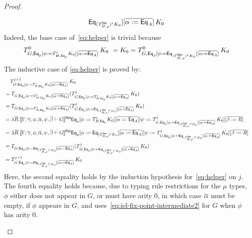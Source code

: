 \documentclass[acmsmall,review,anonymous]{acmart}
\theoremstyle{definition}
\begin{document}
\begin{proof}
\begin{itemize}
\begin{itemize}
\begin{equation}
{    \mathsf{Eq}_{(T^{{\mathsf{Set}}}_{H,\rho})^i K_0}][\overline{\alpha :=
      \mathsf{Eq}_A}]}\,K_0
\end{equation}
Indeed, the base case of~\eqref{eq:helper} is trivial because
\[T^0_{G,
  \mathsf{Eq}_{\rho}[\phi := T^{i}_{H,\mathsf{Eq}_{\rho}} K_0][\overline{\alpha :=
      \mathsf{Eq}_A}]}\,K_0 \ = K_0 = T^0_{G, \mathsf{Eq}_{\rho}[\phi :=
    \mathsf{Eq}_{(T^{{\mathsf{Set}}}_{H,\rho})^i K_0}][\overline{\alpha :=
      \mathsf{Eq}_A}]}\,K_0\] The inductive case of \eqref{eq:helper}
is proved by: \\
\begin{align*}
&\;\;\;\; T^{j+1}_{G, \mathsf{Eq}_{\rho}[\phi := T^{i}_{H,\mathsf{Eq}_{\rho}} K_0][\overline{\alpha := \mathsf{Eq}_A}]}\,K_0 \\
&= T_{G, \mathsf{Eq}_{\rho}[\phi := T^{i}_{H,\mathsf{Eq}_{\rho}} K_0][\overline{\alpha
        := \mathsf{Eq}_A}]} (T^{j}_{G, \mathsf{Eq}_{\rho}[\phi := T^{i}_{H,\mathsf{Eq}_{\rho}}
      K_0][\overline{\alpha := \mathsf{Eq}_A}]}\,K_0) \\
&= T_{G, \mathsf{Eq}_{\rho}[\phi := T^{i}_{H,\mathsf{Eq}_{\rho}} K_0][\overline{\alpha
        := \mathsf{Eq}_A}]} (T^{j}_{G, \mathsf{Eq}_{\rho}[\phi :=
      \mathsf{Eq}_{(T^{{\mathsf{Set}}}_{H,\rho})^i K_0}][\overline{\alpha :=
        \mathsf{Eq}_A}]}\,K_0) \\
&= \lambda \overline{R}. \llbracket{\Gamma; \overline{\gamma}, \phi, \overline{\alpha}, \psi,
    \overline{\beta} \vdash G}\rrbracket^{\mathsf{Rel}} \mathsf{Eq}_{\rho} [\phi := T^{i}_{H,\mathsf{Eq}_{\rho}}
    K_0][\overline{\alpha := \mathsf{Eq}_A}][\psi := T^{j}_{G, \mathsf{Eq}_{\rho}[\phi
        := \mathsf{Eq}_{(T^{{\mathsf{Set}}}_{H,\rho})^i K_0}][\overline{\alpha :=
          \mathsf{Eq}_A}]}\,K_0][\overline{\beta := R}] \\
&= \lambda \overline{R}. \llbracket{\Gamma; \overline{\gamma}, \phi, \overline{\alpha}, \psi,
    \overline{\beta} \vdash G}\rrbracket^{\mathsf{Rel}} \mathsf{Eq}_{\rho} [\phi := \mathsf{Eq}_{(T^{{\mathsf{Set}}}_{H,\rho})^i
      K_0}][\overline{\alpha := \mathsf{Eq}_A}][\psi := T^{j}_{G,
      \mathsf{Eq}_{\rho}[\phi := \mathsf{Eq}_{(T^{{\mathsf{Set}}}_{H,\rho})^n
          K_0}][\overline{\alpha := \mathsf{Eq}_A}]}\,K_0][\overline{\beta :=
      R}] \\
&= T_{G, \mathsf{Eq}_{\rho}[\phi := \mathsf{Eq}_{(T^{{\mathsf{Set}}}_{H,\rho})^i
        K_0}][\overline{\alpha := \mathsf{Eq}_A}]} (T^{j}_{G, \mathsf{Eq}_{\rho}[\phi
      := \mathsf{Eq}_{(T^{{\mathsf{Set}}}_{H,\rho})^i K_0}][\overline{\alpha :=
        \mathsf{Eq}_A}]}\,K_0) \\
&= T^{j+1}_{G, \mathsf{Eq}_{\rho}[\phi := \mathsf{Eq}_{(T^{{\mathsf{Set}}}_{H,\rho})^i
        K_0}][\overline{\alpha := \mathsf{Eq}_A}]}\,K_0
\end{align*}
Here, the second equality holds by the induction hypothesis
for~\eqref{eq:helper} on $j$. The fourth equality holds because,
due to typing rule restrictions for the $\mu$ types,
$\phi$ either does not appear in $G$, or must have arity $0$, in which case
$\overline{\alpha}$ must be empty, if $\phi$ appears in $G$, and
uses~\eqref{eq:iel-fix-point-intermediate2} for $G$ when $\phi$ has
arity $0$.


\end{itemize}
\end{itemize}
\end{proof}
\end{document}

